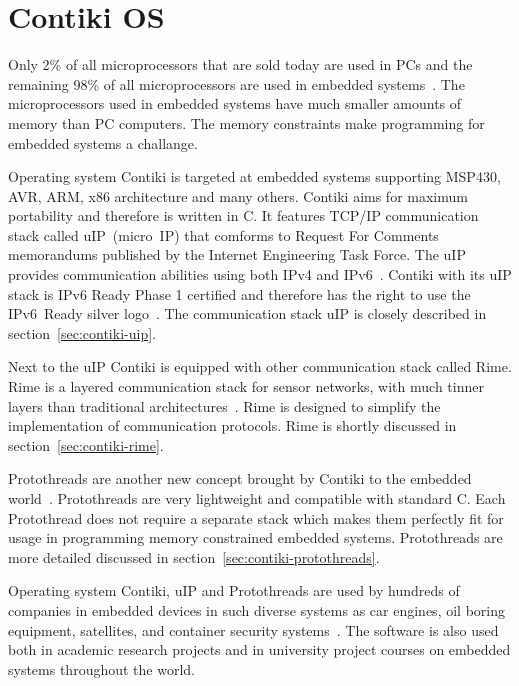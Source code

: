 
\chapter{Contiki OS}
Only 2\% of all microprocessors that are sold today are used in PCs and the remaining 98\%
of all microprocessors are used in embedded systems~\cite{thesis-programming}.
The microprocessors
used in embedded systems have much smaller amounts of memory than PC computers.
The memory constraints make programming for embedded systems a challange.

Operating system Contiki is targeted at embedded systems supporting MSP430, AVR, ARM, x86 architecture and many others.
Contiki aims for maximum portability and therefore is written in C.
It features TCP/IP communication stack called uIP~(micro~IP)
that comforms to Request For Comments memorandums published by the Internet Engineering Task Force.
The uIP provides communication abilities using both IPv4 and IPv6~\cite{contiki-docs}.
Contiki with its uIP stack is IPv6 Ready Phase 1 certified
and therefore has the right to use the IPv6~Ready silver logo~\cite{ipv6ready-db}.
The communication stack uIP is closely described in section~\ref{sec:contiki-uip}.

Next to the uIP Contiki is equipped with other communication stack called Rime.
Rime is a layered communication stack for sensor networks,
with much tinner layers than traditional architectures~\cite{paper-rime}.
Rime is designed to simplify the implementation of communication
protocols.
Rime is shortly discussed in section~\ref{sec:contiki-rime}.

Protothreads are another new concept brought by Contiki to the embedded world~\cite{paper-protothread}.
Protothreads are very lightweight and compatible with standard C.
Each Protothread does not require a separate stack which makes them perfectly
fit for usage in programming memory constrained embedded systems.
Protothreads are more detailed discussed in section~\ref{sec:contiki-protothreads}.

Operating system Contiki, uIP and Protothreads are used by hundreds of companies in embedded devices in
such diverse systems as car engines, oil boring equipment, satellites, and container security systems~\cite{thesis-programming}.
The software is also used both in academic research
projects and in university project courses on embedded systems throughout the
world.

